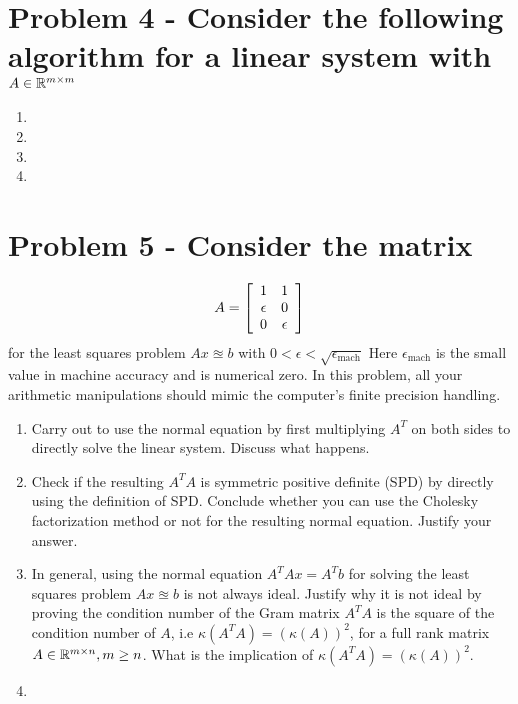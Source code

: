 \documentclass{article}
\begin{document}
\section{Problem 4 - Consider the following algorithm for a linear system with $A \in \mathbb{R}^{m\times m}$}

\begin{enumerate}
\item

\item

\item 

\item 

\end{enumerate}


\section{Problem 5 - Consider the matrix}

\[
    A = \left[\begin{array}{c c}
                1 & 1 \\ \epsilon & 0 \\ 0 & \epsilon \end{array}\right]
\]
for the least squares problem $Ax \approxeq b$ with $0 < \epsilon < \sqrt{\epsilon_{\text{mach}}}$ Here $\epsilon_{\text{mach}}$ is the small value in
machine accuracy and is numerical zero. In this problem, all your arithmetic manipulations should mimic the computer’s finite precision handling.

\begin{enumerate}
\item Carry out to use the normal equation by first multiplying $A^T$ on both sides to directly solve the linear system. Discuss what happens.

\item  Check if the resulting $A^TA$ is symmetric positive definite (SPD) by directly using the definition of SPD. Conclude whether you can use the Cholesky factorization method or not for the resulting normal equation. Justify your answer.

\item In general, using the normal equation $A^TAx = A^Tb$ for solving the least squares problem $Ax \approxeq b$ is not always ideal. Justify why it is not ideal by proving the condition number of the Gram matrix $A^TA$ is the square of the condition number of $A$, i.e $\kappa(A^TA) = (\kappa(A))^2$, for a full rank matrix $A \in \mathbb{R}^{m\times n}, m \ge n$. What is the implication of $\kappa(A^TA) = (\kappa(A))^2$.

\item 

\end{enumerate}
\end{document}
